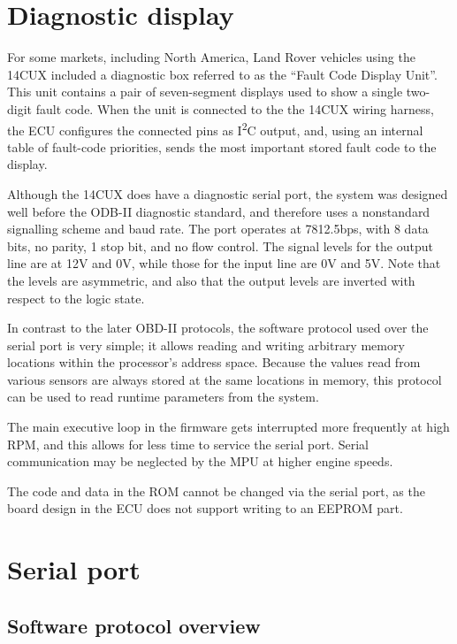\documentclass[11pt,twocolumn]{scrartcl}
\begin{document}
\section {Diagnostic display}
For some markets, including North America, Land Rover vehicles using the 14CUX included a diagnostic box referred to as the ``Fault Code Display Unit''. This unit contains a pair of seven-segment displays used to show a single two-digit fault code. When the unit is connected to the the 14CUX wiring harness, the ECU configures the connected pins as I\textsuperscript{2}C output, and, using an internal table of fault-code priorities, sends the most important stored fault code to the display.

Although the 14CUX does have a diagnostic serial port, the system was designed well before the ODB-II diagnostic standard, and therefore uses a nonstandard signalling scheme and baud rate. The port operates at 7812.5bps, with 8 data bits, no parity, 1 stop bit, and no flow control. The signal levels for the output line are at 12V and 0V, while those for the input line are 0V and 5V. Note that the levels are asymmetric, and also that the output levels are inverted with respect to the logic state.

In contrast to the later OBD-II protocols, the software protocol used over the serial port is very simple; it allows reading and writing arbitrary memory locations within the processor's address space. Because the values read from various sensors are always stored at the same locations in memory, this protocol can be used to read runtime parameters from the system.

The main executive loop in the firmware gets interrupted more frequently at high RPM, and this allows for less time to service the serial port. Serial communication may be neglected by the MPU at higher engine speeds.

The code and data in the ROM cannot be changed via the serial port, as the board design in the ECU does not support writing to an EEPROM part.

\section {Serial port}

\subsection {Software protocol overview}
\end{document}
